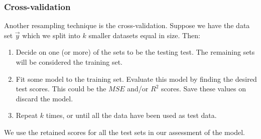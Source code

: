 \subsubsection{Cross-validation}\label{sec:k_fold}
Another resampling technique is the cross-validation. Suppose we have the data set $\vec{y}$ which we split into $k$ smaller datasets equal in size. Then:
\begin{enumerate}
    \item Decide on one (or more) of the sets to be the testing test. The remaining sets will be considered the training set.
    \item Fit some model to the training set. Evaluate this model by finding the desired test scores. This could be the $MSE$ and/or $R^2$ scores. Save these values on discard the model. 
    \item Repeat $k$ times, or until all the data have been used as test data. 
\end{enumerate}
We use the retained scores for all the test sets in our assessment of the model. 
